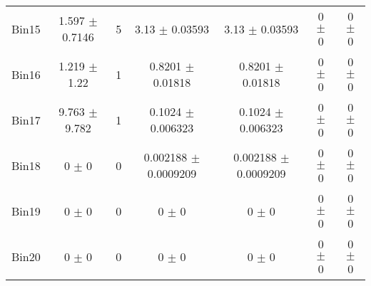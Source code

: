 \begin{tabular}{@{\extracolsep{4pt}}lcccccc@{}}
     Bin15 & 1.597 $\pm$ 0.7146 & 5 & 3.13 $\pm$ 0.03593 & 3.13 $\pm$ 0.03593 & 0 $\pm$ 0 & 0 $\pm$ 0 \\ 
     Bin16 & 1.219 $\pm$ 1.22 & 1 & 0.8201 $\pm$ 0.01818 & 0.8201 $\pm$ 0.01818 & 0 $\pm$ 0 & 0 $\pm$ 0 \\ 
     Bin17 & 9.763 $\pm$ 9.782 & 1 & 0.1024 $\pm$ 0.006323 & 0.1024 $\pm$ 0.006323 & 0 $\pm$ 0 & 0 $\pm$ 0 \\ 
     Bin18 & 0 $\pm$ 0 & 0 & 0.002188 $\pm$ 0.0009209 & 0.002188 $\pm$ 0.0009209 & 0 $\pm$ 0 & 0 $\pm$ 0 \\ 
     Bin19 & 0 $\pm$ 0 & 0 & 0 $\pm$ 0 & 0 $\pm$ 0 & 0 $\pm$ 0 & 0 $\pm$ 0 \\ 
     Bin20 & 0 $\pm$ 0 & 0 & 0 $\pm$ 0 & 0 $\pm$ 0 & 0 $\pm$ 0 & 0 $\pm$ 0 \\ 
\hline\hline
  \end{tabular}
